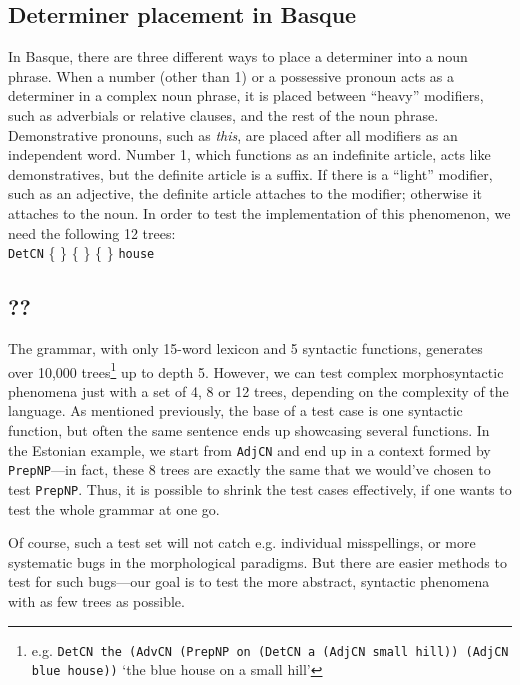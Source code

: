 \documentclass[11pt]{article}
\def\t#1{\texttt{#1}}
\newcommand{\tts}[1]{{\tt #1}}
\begin{document}
\subsection{Determiner placement in Basque} In Basque, there are three
different ways to place a determiner into a noun phrase. When a number
(other than 1) or a possessive pronoun acts as a determiner in a
complex noun phrase, it is placed between ``heavy'' modifiers, such as
adverbials or relative clauses, and the rest of the noun
phrase. Demonstrative pronouns, such as \emph{this}, are placed after
all modifiers as an independent word. Number 1, which functions as an
indefinite article, acts like demonstratives, but the definite article
is a suffix. If there is a ``light'' modifier, such as an adjective,
the definite article attaches to the modifier; otherwise it attaches
to the noun. In order to test the implementation of this phenomenon,
we need the following 12 trees:  \\ 
\t{DetCN} \{
\stackanchor{\stackanchor{}{\tts{the}}}{\stackanchor{\tts{this}}{\tts{your}}}
\} \{  \} 
\{  \}  {\tt house} 

\subsection{??}
\label{sec:wishlist_comments}
The grammar, with only 15-word lexicon and 5 syntactic functions,
generates over 10,000 %
trees\footnote{e.g. {\tt DetCN the (AdvCN (PrepNP on
(DetCN a (AdjCN small hill)) (AdjCN blue house))} `the blue house on a
small hill'}  up to depth 5. 
However, we can test complex morphosyntactic phenomena just with a set
of 4, 8 or 12 trees, depending on the complexity of the language. As
mentioned previously, the base of a test case is one syntactic
function, but often the same sentence ends up showcasing several
functions. In the Estonian example, we start from \t{AdjCN} 
and end up in a context formed by \t{PrepNP}---in fact, these 8 trees
are exactly the same that we would've chosen to test \t{PrepNP}. Thus,
it is possible to shrink the test cases effectively, if one wants to
test the whole grammar at one go.

Of course, such a test set will not catch e.g. individual
misspellings, or more systematic bugs in the morphological
paradigms. But there are easier methods to test for such bugs---our 
goal is to test the more abstract, syntactic phenomena with as few
trees as possible.  
\end{document}
